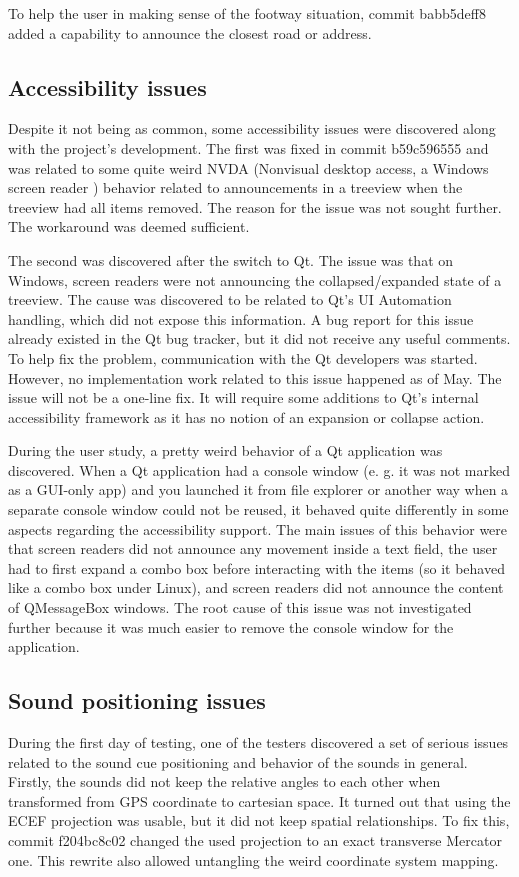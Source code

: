 \documentclass[nolof,digital]{fithesis3}
\begin{document}
To help the user in making sense of the footway situation, commit babb5deff8 added a capability to announce the closest road or address.
\subsection{Accessibility issues} \label{ref:accessibility}
Despite it not being as common, some accessibility issues were discovered along with the project's development. The first was fixed in commit b59c596555 and was related to some quite weird NVDA (Nonvisual desktop access, a Windows screen reader \parencite{nvda}) behavior related to announcements in a treeview when the treeview had all items removed. The reason for the issue was not sought further. The workaround was deemed sufficient.

The second was discovered after the switch to Qt. The issue was that on Windows, screen readers were not announcing the collapsed/expanded state of a treeview. The cause was discovered to be related to Qt's UI Automation handling, which did not expose this information. A bug report for this issue already existed in the Qt bug tracker, but it did not receive any useful comments. To help fix the problem, communication with the Qt developers was started. However, no implementation work related to this issue happened as of May. The issue will not be a one-line fix. It will require some additions to Qt's internal accessibility framework as it has no notion of an expansion or collapse action.

During the user study, a pretty weird behavior of a Qt application was discovered. When a Qt application had a console window (e. g. it was not marked as a GUI-only app) and you launched it from file explorer or another way when a separate console window could not be reused, it behaved quite differently in some aspects regarding the accessibility support. The main issues of this behavior were that screen readers did not announce any movement inside a text field, the user had to first expand a combo box before interacting with the items (so it behaved like a combo box under Linux), and screen readers did not announce the content of QMessageBox windows. The root cause of this issue was not investigated further because it was much easier to remove the console window for the application.
\subsection{Sound positioning issues}
During the first day of testing, one of the testers discovered a set of serious issues related to the sound cue positioning and behavior of the sounds in general. Firstly, the sounds did not keep the relative angles to each other when transformed from GPS coordinate to cartesian space. It turned out that using the ECEF projection was usable, but it did not keep spatial relationships. To fix this, commit f204bc8c02 changed the used projection to an exact transverse Mercator one. This rewrite also allowed untangling the weird coordinate system mapping.
\end{document}
